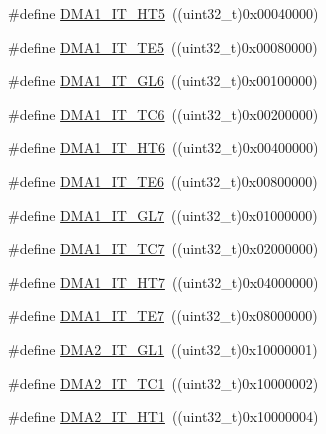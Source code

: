 \begin{DoxyCompactItemize}
\item 
\#define \mbox{\hyperlink{group___d_m_a__interrupts__definition_ga3ddcb696d05b414be7a533993efa849f}{D\+M\+A1\+\_\+\+I\+T\+\_\+\+H\+T5}}~((uint32\+\_\+t)0x00040000)
\item 
\#define \mbox{\hyperlink{group___d_m_a__interrupts__definition_ga7c1f1a465bd0e9755e5fbf2cd7054528}{D\+M\+A1\+\_\+\+I\+T\+\_\+\+T\+E5}}~((uint32\+\_\+t)0x00080000)
\item 
\#define \mbox{\hyperlink{group___d_m_a__interrupts__definition_ga623e986da940dbdbc4155f0c1fc4eae8}{D\+M\+A1\+\_\+\+I\+T\+\_\+\+G\+L6}}~((uint32\+\_\+t)0x00100000)
\item 
\#define \mbox{\hyperlink{group___d_m_a__interrupts__definition_ga466bad6bf0a2c115aee96d2a1e3b8ddf}{D\+M\+A1\+\_\+\+I\+T\+\_\+\+T\+C6}}~((uint32\+\_\+t)0x00200000)
\item 
\#define \mbox{\hyperlink{group___d_m_a__interrupts__definition_ga0a86890a8aa84b5c4f12f1684850fa91}{D\+M\+A1\+\_\+\+I\+T\+\_\+\+H\+T6}}~((uint32\+\_\+t)0x00400000)
\item 
\#define \mbox{\hyperlink{group___d_m_a__interrupts__definition_ga2bbf515c1154a5ad359cbd0ace724e64}{D\+M\+A1\+\_\+\+I\+T\+\_\+\+T\+E6}}~((uint32\+\_\+t)0x00800000)
\item 
\#define \mbox{\hyperlink{group___d_m_a__interrupts__definition_ga3df39a2f922a5f33ebf1ba3f1adfc15d}{D\+M\+A1\+\_\+\+I\+T\+\_\+\+G\+L7}}~((uint32\+\_\+t)0x01000000)
\item 
\#define \mbox{\hyperlink{group___d_m_a__interrupts__definition_ga17efb3180f536c295853e64e5ca508c2}{D\+M\+A1\+\_\+\+I\+T\+\_\+\+T\+C7}}~((uint32\+\_\+t)0x02000000)
\item 
\#define \mbox{\hyperlink{group___d_m_a__interrupts__definition_ga9f8a6dd7fc4978c95cbd9de63c85bc37}{D\+M\+A1\+\_\+\+I\+T\+\_\+\+H\+T7}}~((uint32\+\_\+t)0x04000000)
\item 
\#define \mbox{\hyperlink{group___d_m_a__interrupts__definition_ga1261e2bfa461a8097603b7737eb7698c}{D\+M\+A1\+\_\+\+I\+T\+\_\+\+T\+E7}}~((uint32\+\_\+t)0x08000000)
\item 
\#define \mbox{\hyperlink{group___d_m_a__interrupts__definition_gafe096e037c0b7cc498cdb993d32e06c5}{D\+M\+A2\+\_\+\+I\+T\+\_\+\+G\+L1}}~((uint32\+\_\+t)0x10000001)
\item 
\#define \mbox{\hyperlink{group___d_m_a__interrupts__definition_ga2b6a86186eb56749032aa18b9baff850}{D\+M\+A2\+\_\+\+I\+T\+\_\+\+T\+C1}}~((uint32\+\_\+t)0x10000002)
\item 
\#define \mbox{\hyperlink{group___d_m_a__interrupts__definition_gab9544576514917f9a1fcbb3100c3c2ae}{D\+M\+A2\+\_\+\+I\+T\+\_\+\+H\+T1}}~((uint32\+\_\+t)0x10000004)

\end{DoxyCompactItemize}
